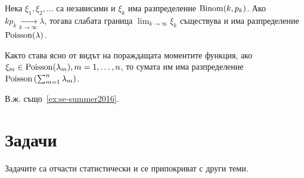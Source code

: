 \documentclass[numbers=endperiod, DIV=15, bibliography=totocnumbered]{scrartcl}
\begin{document}
\begin{theorem}[Поасон]\label{thm:poisson}
  Нека $\xi_1, \xi_2, \ldots$ са независими и $\xi_k$ има разпределение $\operatorname{Binom}(k, p_k)$. Ако $k p_k \underset {k \to \infty} \longrightarrow \lambda$, тогава слабата граница $\lim_{k \to \infty} \xi_k$ съществува и има разпределение $\operatorname{Poisson}(\lambda)$.
\end{theorem}

Както става ясно от видът на пораждащата моментите функция, ако $\xi_m \in \operatorname{Poisson}(\lambda_m), m = 1, \ldots, n$, то сумата им има разпределение $\operatorname{Poisson}\left(\sum_{m=1}^n \lambda_m \right)$.

В.ж. също~\ref{ex:se-summer2016}.

\section{Задачи}

Задачите са отчасти статистически и се припокриват с други теми.
\end{document}
